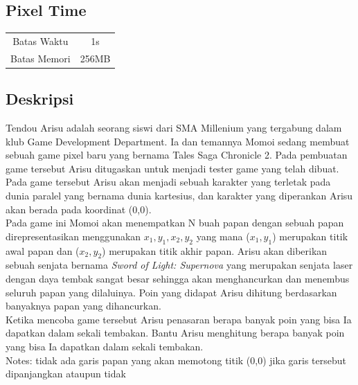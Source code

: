 \documentclass{article}
\begin{document}
\begin{center}

    
    \section*{Pixel Time} %

    \begin{tabular}{ | c c | }
        \hline
        Batas Waktu  & 1s \\    %
        Batas Memori & 256MB \\  %
        \hline
    \end{tabular}
\end{center}

\subsection*{Deskripsi}

Tendou Arisu adalah seorang siswi dari SMA Millenium yang tergabung dalam klub Game Development Department. Ia dan temannya Momoi sedang membuat sebuah game pixel baru yang bernama Tales Saga Chronicle 2. Pada pembuatan game tersebut Arisu ditugaskan untuk menjadi tester game yang telah dibuat. Pada game tersebut Arisu akan menjadi sebuah karakter yang terletak pada dunia paralel yang bernama dunia kartesius, dan karakter yang diperankan Arisu akan berada pada koordinat (0,0).\\

Pada game ini Momoi akan menempatkan N buah papan dengan sebuah papan direpresentasikan menggunakan $x_1, y_1, x_2, y_2$ yang mana ($x_1, y_1$) merupakan titik awal papan dan ($x_2, y_2$) merupakan titik akhir papan. Arisu akan diberikan sebuah senjata bernama \emph{Sword of Light: Supernova} yang merupakan senjata laser dengan daya tembak sangat besar sehingga akan menghancurkan dan menembus seluruh papan yang dilaluinya. Poin yang didapat Arisu dihitung berdasarkan banyaknya papan yang dihancurkan.\\

Ketika mencoba game tersebut Arisu penasaran berapa banyak poin yang bisa Ia dapatkan dalam sekali tembakan. Bantu Arisu menghitung berapa banyak poin yang bisa Ia dapatkan dalam sekali tembakan.\\

Notes: tidak ada garis papan yang akan memotong titik (0,0) jika garis tersebut dipanjangkan ataupun tidak
\end{document}
